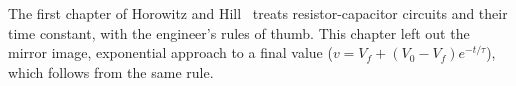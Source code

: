 \begin{readingbox}
The first chapter of Horowitz and Hill~\cite{horowitz2015art} treats resistor-capacitor circuits and their time
constant, with the engineer's rules of thumb. This chapter left out the mirror image, exponential approach to a
final value ($v=V_f+(V_0-V_f)e^{-t/\tau}$), which follows from the same rule.
\end{readingbox}
